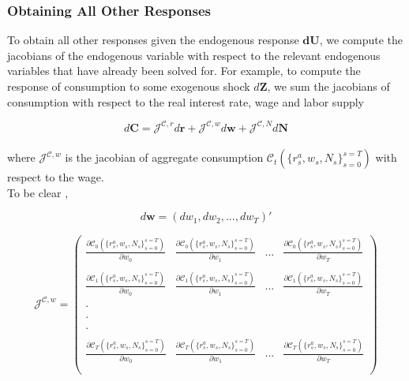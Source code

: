 \documentclass[titlepage]{\econtex}\providecommand{\texname}{FBS-NK}
\begin{document}
 
 
 
\hypertarget{Obtaining All Other Responses}{}
\subsubsection{Obtaining All Other Responses} 

To obtain all other responses given the endogenous response $\mathbf{dU}$, we compute the jacobians of the endogenous variable with respect to the relevant endogenous variables that have already been solved for.  For example, to compute the response of consumption to some exogenous shock $d\mathbf{Z}$, we sum  the jacobians of consumption with respect to the real interest rate, wage and labor supply 

$$ d\mathbf{C} = \mathcal{J}^{\mathcal{C} , r} d\mathbf{r} +\mathcal{J}^{\mathcal{C} , w} d\mathbf{w} +\mathcal{J}^{\mathcal{C} , N} d\mathbf{N} $$\\
 
 where $\mathcal{J}^{\mathcal{C} , w} $ is the jacobian of aggregate consumption  $\mathcal{C}_{t}(\{r_{s}^{a} ,w_{s}, N_{s}\}_{s=0}^{s=T}) $  with respect to the wage. \\
 
 To be clear , 
 
$$d\mathbf{w} =  ( dw_{1}, dw_{2}, . . . , dw_{T})' $$
 
 
 
 $$\mathcal{J}^{\mathcal{C} , w} =   \begin{pmatrix} 
\frac{ \partial \mathcal{C}_{0}(\{r_{s}^{a} ,w_{s}, N_{s}\}_{s=0}^{s=T})}{\partial w_{0}}  & \frac{ \partial \mathcal{C}_{0}(\{r_{s}^{a} ,w_{s}, N_{s}\}_{s=0}^{s=T})}{\partial w_{1}}&    ... & \frac{ \partial \mathcal{C}_{0}(\{r_{s}^{a} ,w_{s}, N_{s}\}_{s=0}^{s=T})}{\partial w_{T}} \\ \\ 
\frac{ \partial \mathcal{C}_{1}(\{r_{s}^{a} ,w_{s}, N_{s}\}_{s=0}^{s=T})}{\partial w_{0}}  &\frac{ \partial \mathcal{C}_{1}(\{r_{s}^{a} ,w_{s}, N_{s}\}_{s=0}^{s=T})}{\partial w_{1}}& ... & \frac{ \partial \mathcal{C}_{1}(\{r_{s}^{a} ,w_{s}, N_{s}\}_{s=0}^{s=T})}{\partial w_{T}} \\ \\
.  \\ \\
.  \\ \\
. \\ \\
\frac{ \partial \mathcal{C}_{T}(\{r_{s}^{a} ,w_{s}, N_{s}\}_{s=0}^{s=T})}{\partial w_{0}}  &\frac{ \partial \mathcal{C}_{T}(\{r_{s}^{a} ,w_{s}, N_{s}\}_{s=0}^{s=T})}{\partial w_{1}}& ... & \frac{ \partial \mathcal{C}_{T}(\{r_{s}^{a} ,w_{s}, N_{s}\}_{s=0}^{s=T})}{\partial w_{T}}  \\ \\
 \end{pmatrix} $$ \\
 
\end{document}
